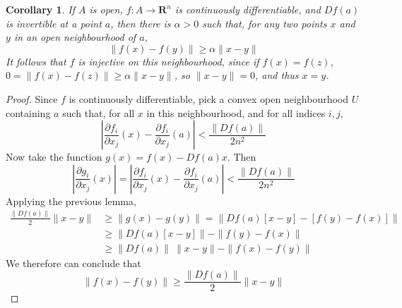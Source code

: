 \documentclass[12pt]{amsbook}
\theoremstyle{plain}
\newtheorem{corollary}[theorem]{Corollary}
\theoremstyle{definition}
\begin{document}
\begin{corollary}
    If $A$ is open, $f: A \to \mathbf{R}^n$ is continuously differentiable, and $Df(a)$ is invertible at a point $a$, then there is $\alpha > 0$ such that, for any two points $x$ and $y$ in an open neighbourhood of $a$,
    \[ \| f(x) - f(y) \| \geq \alpha \| x - y \| \]
    It follows that $f$ is injective on this neighbourhood, since if $f(x) = f(z)$, $0 = \|f(x) - f(z)\| \geq \alpha \|x - y\|$, so $\|x - y\| = 0$, and thus $x = y$.
\end{corollary}
\begin{proof}
    Since $f$ is continuously differentiable, pick a convex open neighbourhood $U$ containing $a$ such that, for all $x$ in this neighbourhood, and for all indices $i, j$,
    \[ | \frac{\partial f_i}{\partial x_j}(x) - \frac{\partial f_i}{\partial x_j}(a) | < \frac{\|Df(a)\|}{2n^2} \]
    Now take the function $g(x) = f(x) - Df(a)x$. Then
    \[ | \frac{\partial g_i}{\partial x_j}(x) | = | \frac{\partial f_i}{\partial x_j}(x) - \frac{\partial f_i}{\partial x_j}(a) | < \frac{\|Df(a)\|}{2n^2} \]
    Applying the previous lemma,
    \begin{align*}
        \frac{\|Df(a)\|}{2} \|x - y\| &\geq \| g(x) - g(y) \| = \| Df(a)[x - y] - [f(y) - f(x)] \|\\
        &\geq \| Df(a) [x - y]\| - \|f(y) - f(x)\| \\
    &\geq \|Df(a)\|\ \|x - y\| - \|f(x) - f(y)\|
    \end{align*}
    We therefore can conclude that
    \[ \|f(x) - f(y)\| \geq \frac{\|Df(a)\|}{2} \|x - y\| \]
\end{proof}
\end{document}
